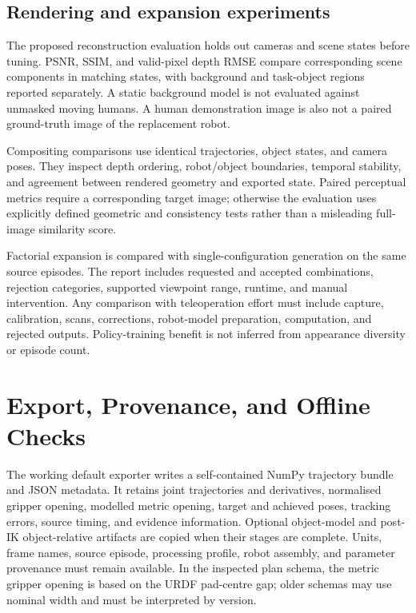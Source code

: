 \subsection{Rendering and expansion experiments}

The proposed reconstruction evaluation holds out cameras and scene states
before tuning. PSNR, SSIM, and valid-pixel depth RMSE compare corresponding
scene components in matching states, with background and task-object
regions reported separately. A static background model is not evaluated
against unmasked moving humans. A human demonstration image is also not
a paired ground-truth image of the replacement robot.

Compositing comparisons use identical trajectories, object states, and
camera poses. They inspect depth ordering, robot/object boundaries,
temporal stability, and agreement between rendered geometry and exported
state. Paired perceptual metrics require a corresponding target image;
otherwise the evaluation uses explicitly defined geometric and consistency
tests rather than a misleading full-image similarity score.

Factorial expansion is compared with single-configuration generation on
the same source episodes. The report includes requested and accepted
combinations, rejection categories, supported viewpoint range, runtime,
and manual intervention. Any comparison with teleoperation effort must
include capture, calibration, scans, corrections, robot-model preparation,
computation, and rejected outputs. Policy-training benefit is not inferred
from appearance diversity or episode count.

\section{Export, Provenance, and Offline Checks}
\label{sec:export}

The working default exporter writes a self-contained NumPy trajectory
bundle and JSON metadata. It retains joint trajectories and derivatives,
normalised gripper opening, modelled metric opening, target and achieved
poses, tracking errors, source timing, and evidence information. Optional
object-model and post-IK object-relative artifacts are copied when their
stages are complete. Units, frame names, source episode, processing
profile, robot assembly, and parameter provenance must remain available.
In the inspected plan schema, the metric gripper opening is based on the
URDF pad-centre gap; older schemas may use nominal width and must be
interpreted by version.

